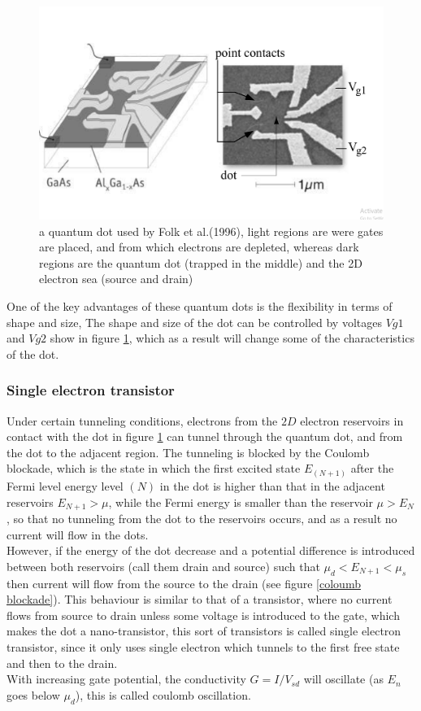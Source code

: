 \documentclass[twoside,11pt]{article}
\begin{document}
    \begin{figure}[h]
        \centering
        \includegraphics[scale = 0.35]{2024-04-06.png}
        \caption{a quantum dot used by Folk et al.(1996), light regions are were gates are placed, and from which electrons are depleted, whereas dark regions are the quantum dot (trapped in the middle) and the 2D electron sea (source and drain)}
        \label{one electron transistor}
    \end{figure}
    
    One of the key advantages of these quantum dots is the flexibility in terms of shape and size, The shape and size of the dot can be controlled
    by voltages $Vg1$ and $Vg2$ show in figure \ref{one electron transistor}, which as a result will change some of the characteristics of the dot.\\
        \subsubsection{Single electron transistor}
        Under certain tunneling conditions, electrons from the $2D$ electron reservoirs in contact with the dot in figure \ref{one electron transistor} can tunnel through the quantum dot, and from the dot to the adjacent region. The tunneling is blocked by the Coulomb blockade, which is the state in which the first excited state $E_{(N+1)}$ after the Fermi level energy level $(N)$ in the dot is higher than that in the adjacent reservoirs $E_{N+1} > \mu$, while the Fermi energy is smaller than the reservoir $\mu > E_N$, so that no tunneling from the dot to the reservoirs occurs, and as a result no current will flow in the dots.\\ However, if the energy of the dot decrease and a potential difference is introduced between both reservoirs (call them drain and source) such that $\mu_d<E_{N+1}<\mu_s$ then current will flow from the source to the drain (see figure \ref{coloumb blockade}). This behaviour is similar to that of a transistor, where no current flows from source to drain unless some voltage is introduced to the gate, which makes the dot a nano-transistor, this sort of transistors is called single electron transistor, since it only uses single electron which tunnels to the first free state and then to the drain.\\With increasing gate potential, the conductivity $G=I/V_{sd}$ will oscillate (as $E_n$ goes below $\mu_d$), this is called coulomb oscillation.
        
\end{document}
